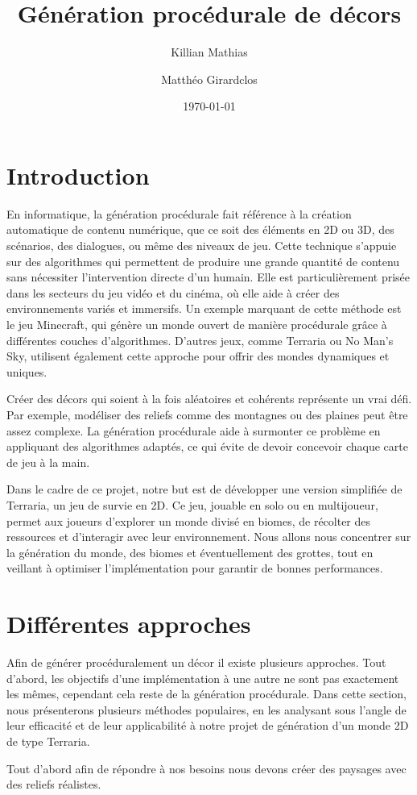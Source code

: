 \documentclass{article}
\author{Killian Mathias}{I}
\author{Matthéo Girardclos}{II}
\title{Génération procédurale de décors}
\date{\today}
\begin{document}
\maketitle
\newpage

\tableofcontents
\newpage

\section{Introduction}

En informatique, la génération procédurale fait référence à la création automatique de contenu numérique, que ce soit des éléments en 2D ou 3D, des scénarios, des dialogues, ou même des niveaux de jeu. Cette technique s'appuie sur des algorithmes qui permettent de produire une grande quantité de contenu sans nécessiter l'intervention directe d'un humain. Elle est particulièrement prisée dans les secteurs du jeu vidéo et du cinéma, où elle aide à créer des environnements variés et immersifs.  Un exemple marquant de cette méthode est le jeu Minecraft, qui génère un monde ouvert de manière procédurale grâce à différentes couches d'algorithmes. D'autres jeux, comme Terraria ou No Man’s Sky, utilisent également cette approche pour offrir des mondes dynamiques et uniques.\par
Créer des décors qui soient à la fois aléatoires et cohérents représente un vrai défi. Par exemple, modéliser des reliefs comme des montagnes ou des plaines peut être assez complexe. La génération procédurale aide à surmonter ce problème en appliquant des algorithmes adaptés, ce qui évite de devoir concevoir chaque carte de jeu à la main.\par
Dans le cadre de ce projet, notre but est de développer une version simplifiée de Terraria, un jeu de survie en 2D. Ce jeu, jouable en solo ou en multijoueur, permet aux joueurs d'explorer un monde divisé en biomes, de récolter des ressources et d'interagir avec leur environnement. Nous allons nous concentrer sur la génération du monde, des biomes et éventuellement des grottes, tout en veillant à optimiser l'implémentation pour garantir de bonnes performances.


\section{Différentes approches}

Afin de générer procéduralement un décor il existe plusieurs approches. Tout d'abord, les objectifs d'une implémentation à une autre ne sont pas exactement les mêmes, cependant cela reste de la génération procédurale. Dans cette section, nous présenterons plusieurs méthodes populaires, en les analysant sous l’angle de leur efficacité et de leur applicabilité à notre projet de génération d’un monde 2D de type Terraria.\par
Tout d'abord afin de répondre à nos besoins nous devons créer des paysages avec des reliefs réalistes.
\end{document}
